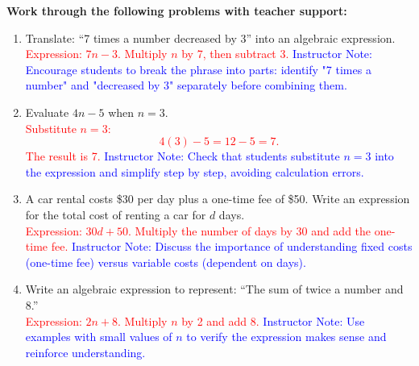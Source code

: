 \documentclass[12pt]{article}
\begin{document}
\begin{tcolorbox}[colframe=black!60, colback=white, 
coltitle=black, colbacktitle=black!15, fonttitle=\bfseries\Large, 
title=Guided Practice, halign title=center, left=10pt, right=10pt, top=10pt, bottom=15pt]
\textbf{Work through the following problems with teacher support:}
\begin{enumerate}[itemsep=3em]
    \item Translate: “7 times a number decreased by 3” into an algebraic expression. \\
    \textcolor{red}{Expression: \( 7n - 3 \). Multiply \( n \) by 7, then subtract 3.}
    \textcolor{blue}{Instructor Note: Encourage students to break the phrase into parts: identify "7 times a number" and "decreased by 3" separately before combining them.}

    \item Evaluate \( 4n - 5 \) when \( n = 3 \). \\
    \textcolor{red}{Substitute \( n = 3 \): 
    \[
    4(3) - 5 = 12 - 5 = 7.
    \]
    The result is 7.}
    \textcolor{blue}{Instructor Note: Check that students substitute \( n = 3 \) into the expression and simplify step by step, avoiding calculation errors.}

    \item A car rental costs \$30 per day plus a one-time fee of \$50. Write an expression for the total cost of renting a car for \( d \) days. \\
    \textcolor{red}{Expression: \( 30d + 50 \). Multiply the number of days by 30 and add the one-time fee.}
    \textcolor{blue}{Instructor Note: Discuss the importance of understanding fixed costs (one-time fee) versus variable costs (dependent on days).}

    \item Write an algebraic expression to represent: “The sum of twice a number and 8.” \\
    \textcolor{red}{Expression: \( 2n + 8 \). Multiply \( n \) by 2 and add 8.}
    \textcolor{blue}{Instructor Note: Use examples with small values of \( n \) to verify the expression makes sense and reinforce understanding.}
\end{enumerate}
\end{tcolorbox}
\end{document}
